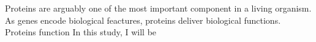 Proteins are arguably one of the most important component in a living organism. As genes encode biological feactures, proteins deliver biological functions. Proteins function  In this study, I will be 